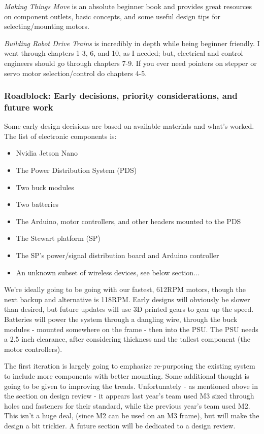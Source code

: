 \documentclass[a4paper, 10pt]{article}
\begin{document}
		\textit{Making Things Move} is an absolute beginner book and provides great resources on component outlets, basic concepts, and some useful design tips for selecting/mounting motors. 
		
		\textit{Building Robot Drive Trains} is incredibly in depth while being beginner friendly. I went through chapters 1-3, 6, and 10, as I needed; but, electrical and control engineers should go through chapters 7-9. If you ever need pointers on stepper or servo motor selection/control do chapters 4-5. 
		
		\subsubsection{Roadblock: Early decisions, priority considerations, and future work}
		Some early design decisions are based on available materials and what's worked. The list of electronic components is:
		\begin{itemize}
			\item Nvidia Jetson Nano
			\item The Power Distribution System (PDS)
			\item Two buck modules
			\item Two batteries
			\item The Arduino, motor controllers, and other headers mounted to the PDS
			\item The Stewart platform (SP)
			\item The SP's power/signal distribution board and Arduino controller
			\item An unknown subset of wireless devices, see below section... 
		\end{itemize}
		We're ideally going to be going with our fastest, 612RPM motors, though the next backup and alternative is 118RPM. Early designs will obviously be slower than desired, but future updates will use 3D printed gears to gear up the speed. Batteries will power the system through a dangling wire, through the buck modules - mounted somewhere on the frame - then into the PSU. The PSU needs a 2.5 inch clearance, after considering thickness and the tallest component (the motor controllers). 
		
		The first iteration is largely going to emphasize re-purposing the existing system to include more components with better mounting. Some additional thought is going to be given to improving the treads. Unfortunately - as mentioned above in the section on design review - it appears last year's team used M3 sized through holes and fasteners for their standard, while the previous year's team used M2. This isn't a huge deal, (since M2 can be used on an M3 frame), but will make the design a bit trickier. A future section will be dedicated to a design review.
		
\end{document}
